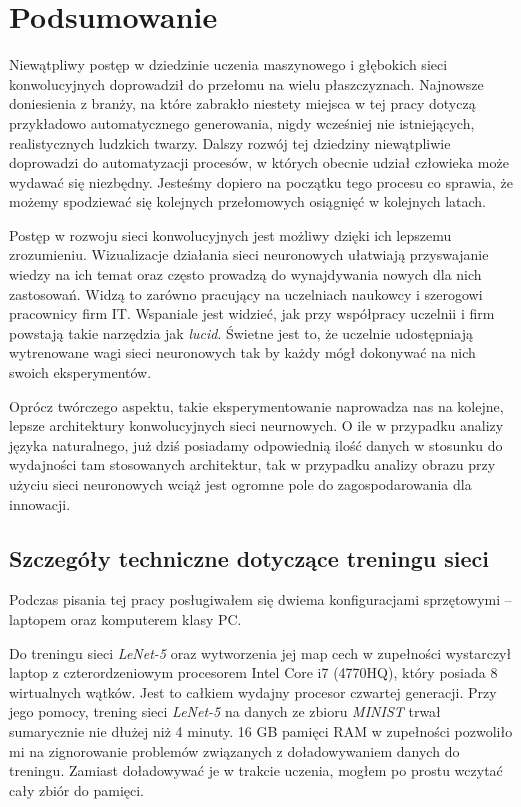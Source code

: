 \chapter{Podsumowanie}
\label{chap:summary}

Niewątpliwy postęp w dziedzinie uczenia maszynowego i głębokich sieci konwolucyjnych doprowadził do przełomu na wielu płaszczyznach. Najnowsze doniesienia z branży, na które zabrakło niestety miejsca w tej pracy dotyczą przykładowo automatycznego generowania, nigdy wcześniej nie istniejących, realistycznych ludzkich twarzy.
Dalszy rozwój tej dziedziny niewątpliwie doprowadzi do automatyzacji procesów, w których obecnie udział człowieka może wydawać się niezbędny. Jesteśmy dopiero na początku tego procesu co sprawia, że możemy spodziewać się kolejnych przełomowych osiągnięć w kolejnych latach.

Postęp w rozwoju sieci konwolucyjnych jest możliwy dzięki ich lepszemu zrozumieniu. Wizualizacje działania sieci neuronowych ułatwiają przyswajanie wiedzy na ich temat oraz często prowadzą do wynajdywania nowych dla nich zastosowań. Widzą to zarówno pracujący na uczelniach naukowcy i szerogowi pracownicy firm IT. Wspaniale jest widzieć, jak przy współpracy uczelnii i firm powstają takie narzędzia jak \textit{lucid}. Świetne jest to, że uczelnie udostępniają wytrenowane
wagi sieci neuronowych tak by każdy mógł dokonywać na nich swoich eksperymentów.

Oprócz twórczego aspektu, takie eksperymentowanie naprowadza nas na kolejne, lepsze architektury konwolucyjnych sieci neurnowych. O ile w przypadku analizy języka naturalnego, już dziś posiadamy odpowiednią ilość danych w stosunku do wydajności tam stosowanych architektur, tak w przypadku analizy obrazu przy użyciu sieci neuronowych wciąż jest ogromne pole do zagospodarowania dla innowacji.

\section{Szczegóły techniczne dotyczące treningu sieci}
Podczas pisania tej pracy posługiwałem się dwiema konfiguracjami sprzętowymi -- laptopem oraz komputerem klasy PC.

Do treningu sieci \textit{LeNet-5} oraz wytworzenia jej map cech w zupełności wystarczył laptop z czterordzeniowym procesorem
Intel Core i7 (4770HQ), który posiada 8 wirtualnych wątków. Jest to całkiem wydajny procesor czwartej generacji. 
Przy jego pomocy, trening sieci \textit{LeNet-5} na danych ze zbioru \textit{MINIST} trwał sumarycznie nie dłużej niż 4 minuty. 16 GB pamięci RAM w zupełności pozwoliło mi na zignorowanie problemów związanych z doładowywaniem danych do treningu. Zamiast doładowywać je w trakcie uczenia, mogłem po prostu wczytać cały zbiór do pamięci. 

